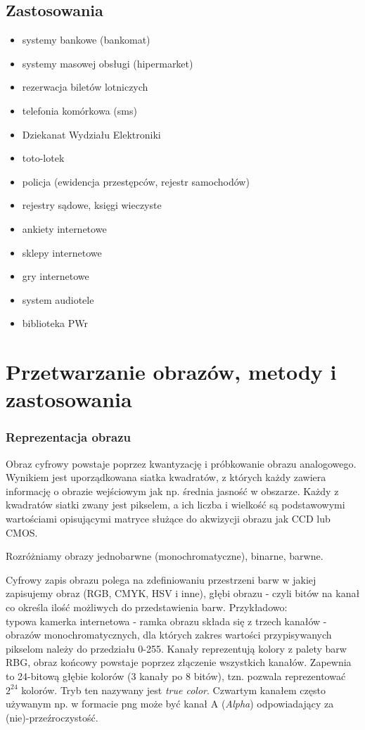 \documentclass[a4paper,twoside]{report}
\begin{document}
\subsection{Zastosowania}

\begin{itemize}
\item systemy bankowe (bankomat)
\item systemy masowej obsługi (hipermarket)
\item rezerwacja biletów lotniczych
\item telefonia komórkowa (sms)
\item Dziekanat Wydziału Elektroniki
\item toto-lotek
\item policja (ewidencja przestępców, rejestr samochodów)
\item rejestry sądowe, księgi wieczyste
\item ankiety internetowe
\item sklepy internetowe
\item gry internetowe
\item system audiotele
\item biblioteka PWr
\end{itemize}


\section{Przetwarzanie obrazów, metody i zastosowania}
\subsubsection{Reprezentacja obrazu}
Obraz cyfrowy powstaje poprzez kwantyzację i próbkowanie obrazu analogowego. Wynikiem jest uporządkowana siatka kwadratów, z których każdy zawiera informację o obrazie wejściowym jak np. średnia jasność w obszarze. Każdy z kwadratów siatki zwany jest pikselem, a ich liczba i wielkość są podstawowymi wartościami opisującymi matryce służące do akwizycji obrazu jak CCD lub CMOS.

Rozróżniamy obrazy jednobarwne (monochromatyczne), binarne, barwne.

Cyfrowy zapis obrazu polega na zdefiniowaniu przestrzeni barw w jakiej zapisujemy obraz (RGB, CMYK, HSV i inne), głębi obrazu - czyli bitów na kanał co określa ilość możliwych do przedstawienia barw. Przykładowo: \\
typowa kamerka internetowa - ramka obrazu składa się z trzech kanałów - obrazów monochromatycznych, dla których zakres wartości przypisywanych pikselom należy do przedziału 0-255. Kanały reprezentują kolory z palety barw RBG, obraz końcowy powstaje poprzez złączenie wszystkich kanałów. 
Zapewnia to 24-bitową głębie kolorów (3 kanały po 8 bitów), tzn. pozwala reprezentować $2^{24}$  kolorów. Tryb ten nazywany jest \textit{true color}. 
Czwartym kanałem często używanym np. w formacie png może być kanał A (\textit{Alpha}) odpowiadający za (nie)-przeźroczystość.
\end{document}
